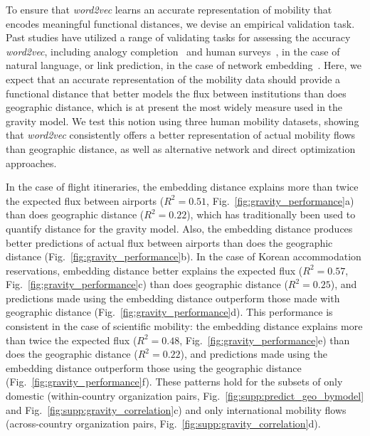 \documentclass[12pt]{article} %
\begin{document}
To ensure that \textit{word2vec} learns an accurate representation of mobility that encodes meaningful functional distances, we devise an empirical validation task.
Past studies have utilized a range of validating tasks for assessing the accuracy \textit{word2vec}, including analogy completion~\cite{mikolov2013word2vec} and human surveys~\cite{kozlowski2018geometry}, in the case of natural language, or link prediction, in the case of network embedding~\cite{perozzi2014deepwalk, grover2016node2vec}.
Here, we expect that an accurate representation of the mobility data should provide a functional distance that better models the flux between institutions than does geographic distance, which is at present the most widely measure used in the gravity model.
We test this notion using three human mobility datasets, showing that \textit{word2vec} consistently offers a better representation of actual mobility flows than geographic distance, as well as alternative network and direct optimization approaches.


In the case of flight itineraries, the embedding distance explains more than twice the expected flux between airports ($R^{2} = 0.51$, Fig.~\ref{fig:gravity_performance}a) than does geographic distance ($R^{2} = 0.22$), which has traditionally been used to quantify distance for the gravity model.
Also, the embedding distance produces better predictions of actual flux between airports than does the geographic distance (Fig.~\ref{fig:gravity_performance}b).
In the case of Korean accommodation reservations, embedding distance better explains the expected flux ($R^{2} = 0.57$, Fig.~\ref{fig:gravity_performance}c) than does geographic distance ($R^{2} = 0.25$), and predictions made using the embedding distance outperform those made with geographic distance (Fig.~\ref{fig:gravity_performance}d).
This performance is consistent in the case of scientific mobility:
the embedding distance explains more than twice the expected flux ($R^{2} = 0.48$, Fig.~\ref{fig:gravity_performance}e) than does the geographic distance ($R^{2} = 0.22$), and predictions made using the embedding distance outperform those using the geographic distance (Fig.~\ref{fig:gravity_performance}f).
These patterns hold for the subsets of only domestic (within-country organization pairs, Fig.~\ref{fig:supp:predict_geo_bymodel} and Fig.~\ref{fig:supp:gravity_correlation}c) and only international mobility flows (across-country organization pairs, Fig.~\ref{fig:supp:gravity_correlation}d).
\end{document}
